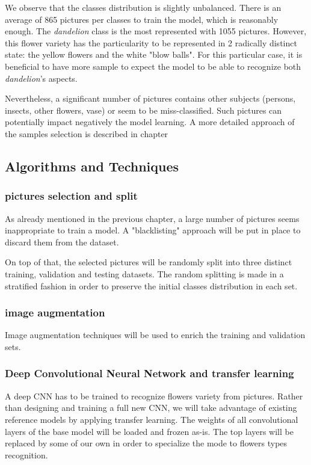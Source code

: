 We observe that the classes distribution is slightly unbalanced. There is an average of 865 pictures per classes to train the model, which is reasonably enough. The \textit{dandelion} class is the most represented with 1055 pictures. However, this flower variety has the particularity to be represented in 2 radically distinct state: the yellow flowers and the white "blow balls".
For this particular case, it is beneficial to have more sample to expect the model to be able to recognize both \textit{dandelion}'s aspects.  

Nevertheless, a significant number of pictures contains other subjects (persons, insects, other flowers, vase) or seem to be miss-classified. Such pictures can potentially impact negatively the model learning. A more detailed approach of the samples selection is described in chapter  

\subsection{Algorithms and Techniques}

\subsubsection{pictures selection and split }

As already mentioned in the previous chapter, a large number of pictures seems inappropriate to train a model. A "blacklisting" approach will be put in place to discard them from the dataset.

On top of that, the selected pictures will be randomly split into three distinct training, validation and testing datasets. The random splitting is made in a stratified fashion in order to preserve the initial classes distribution in each set.

\subsubsection{image augmentation}

Image augmentation techniques will be used to enrich the training and validation sets. 

\subsubsection{Deep Convolutional Neural Network and transfer learning}

A deep CNN has to be trained to recognize flowers variety from pictures. Rather than designing and training a full new CNN, we will take advantage of existing reference models by applying transfer learning. The weights of all convolutional layers of the base model will be loaded and frozen as-is. The top layers will be replaced by some of our own in order to specialize the mode to flowers types recognition. 

